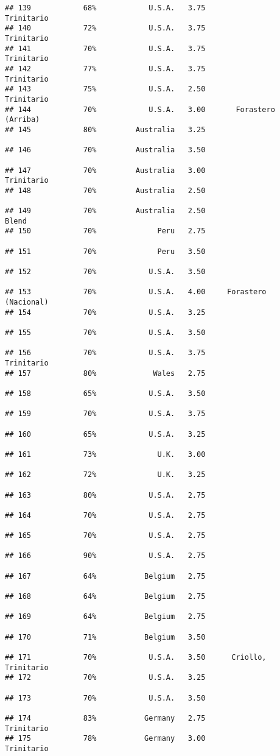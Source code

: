 \documentclass[
]{article}
\begin{document}
\begin{verbatim}
## 139            68%            U.S.A.   3.75               Trinitario
## 140            72%            U.S.A.   3.75               Trinitario
## 141            70%            U.S.A.   3.75               Trinitario
## 142            77%            U.S.A.   3.75               Trinitario
## 143            75%            U.S.A.   2.50               Trinitario
## 144            70%            U.S.A.   3.00       Forastero (Arriba)
## 145            80%         Australia   3.25                         
## 146            70%         Australia   3.50                         
## 147            70%         Australia   3.00               Trinitario
## 148            70%         Australia   2.50                         
## 149            70%         Australia   2.50                    Blend
## 150            70%              Peru   2.75                         
## 151            70%              Peru   3.50                         
## 152            70%            U.S.A.   3.50                         
## 153            70%            U.S.A.   4.00     Forastero (Nacional)
## 154            70%            U.S.A.   3.25                         
## 155            70%            U.S.A.   3.50                         
## 156            70%            U.S.A.   3.75               Trinitario
## 157            80%             Wales   2.75                         
## 158            65%            U.S.A.   3.50                         
## 159            70%            U.S.A.   3.75                         
## 160            65%            U.S.A.   3.25                         
## 161            73%              U.K.   3.00                         
## 162            72%              U.K.   3.25                         
## 163            80%            U.S.A.   2.75                         
## 164            70%            U.S.A.   2.75                         
## 165            70%            U.S.A.   2.75                         
## 166            90%            U.S.A.   2.75                         
## 167            64%           Belgium   2.75                         
## 168            64%           Belgium   2.75                         
## 169            64%           Belgium   2.75                         
## 170            71%           Belgium   3.50                         
## 171            70%            U.S.A.   3.50      Criollo, Trinitario
## 172            70%            U.S.A.   3.25                         
## 173            70%            U.S.A.   3.50                         
## 174            83%           Germany   2.75               Trinitario
## 175            78%           Germany   3.00               Trinitario

\end{verbatim}
\end{document}
